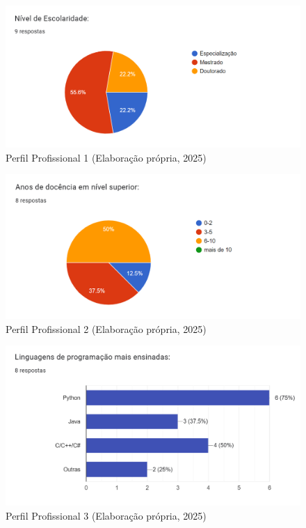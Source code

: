 \begin{figure}[ht]
	\centering
	\includegraphics[width=16cm]{./imagens/capitulo8/1-escolaridade}
	\caption{Perfil Profissional 1 (Elaboração própria, 2025) }
	\label{fig:nivel-escolaridade}
\end{figure}
\begin{figure}[ht]
	\centering
	\includegraphics[width=16cm]{./imagens/capitulo8/2-anos-docencia}
	\caption{Perfil Profissional 2 (Elaboração própria, 2025) }
	\label{fig:anos-docencia}
\end{figure}
\begin{figure}[ht]
	\centering
	\includegraphics[width=16cm]{./imagens/capitulo8/2-linguagens-ensinadas}
	\caption{Perfil Profissional 3 (Elaboração própria, 2025) }
	\label{fig:linguagens-ensinadas}
\end{figure}

